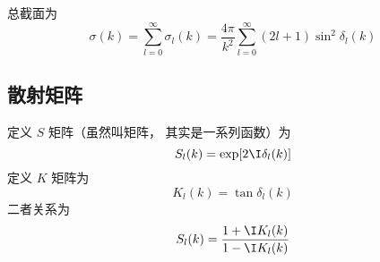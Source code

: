 总截面为
\begin{equation}
\sigma(k) = \sum_{l=0}^\infty \sigma_l(k) = \frac{4\pi}{k^2} \sum_{l=0}^\infty (2l + 1) \sin^2 \delta_l(k)
\end{equation}

\subsection{散射矩阵}
定义 $S$ 矩阵（虽然叫矩阵， 其实是一系列函数）为
\begin{equation}
S_l(k) = \exp[2\I\delta_l(k)]
\end{equation}
定义 $K$ 矩阵为
\begin{equation}
K_l(k) = \tan \delta_l(k)
\end{equation}
二者关系为
\begin{equation}
S_l(k) = \frac{1 + \I K_l(k)}{1 - \I K_l(k)}
\end{equation}
